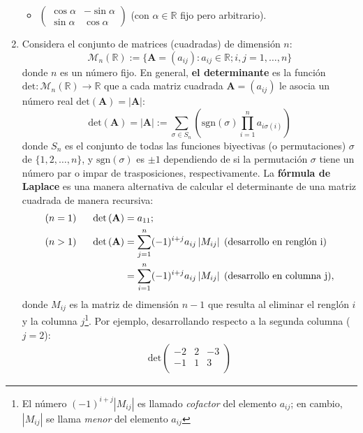 \documentclass[8pt,a4paper]{article}
\begin{document}
\begin{enumerate}
\begin{multicols}{3}
\begin{itemize}
			\item $\displaystyle \begin{pmatrix} \cos \alpha & -\sin \alpha \\ \sin \alpha & \cos \alpha \end{pmatrix}$ (con $\alpha\in\mathbb{R}$ fijo pero arbitrario).
		\end{itemize}
	\end{multicols}
		\item Considera el conjunto de matrices (cuadradas) de dimensión $n$:
%
			\[ \mathcal{M}_n(\mathbb{R}):=\{\mathbf{A}=(a_{ij}):a_{ij}\in\mathbb{R}; i,j=1,\dots,n\} \]
%
donde $n$ es un número fijo. En general, \textbf{el determinante} es la función $\mathrm{det}:\mathcal{M}_n(\mathbb{R})\longrightarrow\mathbb{R}$ que a cada matriz cuadrada $\mathbf{A}=(a_{ij})$ le asocia un número real $\mathrm{det}\left(\mathbf{A}\right)=\left|\mathbf{A}\right|$:
%
	\[
	\mathrm{det}\left(\mathbf{A}\right)=\left|\mathbf{A}\right|:=\sum_{\sigma\in S_n} 
		\left(\mathrm{sgn}(\sigma)\prod_{i=1}^n a_{i\sigma(i)}\right)
	\]
%
donde $S_n$ es el conjunto de todas las funciones biyectivas (o permutaciones) $\sigma$ de $\{1,2,\dots,n\}$, y $\mathrm{sgn}(\sigma)$ es $\pm 1$ dependiendo de si la permutación $\sigma$ tiene un número par o impar de trasposiciones, respectivamente. La \textbf{fórmula de Laplace} es una manera alternativa de calcular el determinante de una matriz cuadrada de manera recursiva:
%
\begin{align*}
(n=1) \hspace{6mm} \mathrm{det}\left(\mathbf{A}\right)&=a_{11}; \\
(n>1) \hspace{6mm} \mathrm{det}\left(\mathbf{A}\right)&=
		\sum_{j=1}^n (-1)^{i+j}a_{ij}\left|M_{ij}\right| \;(\text{desarrollo en renglón i})\\
		&=\sum_{i=1}^n (-1)^{i+j}a_{ij}\left|M_{ij}\right| \;\text{(desarrollo en columna j)},
\end{align*}
%
donde $M_{ij}$ es la matriz de dimensión $n-1$ que resulta al eliminar el renglón $i$ y la columna $j$\footnote{El número $(-1)^{i+j}\left|M_{ij}\right|$ es llamado \textit{cofactor} del elemento $a_{ij}$; en cambio, $\left|M_{ij}\right|$ se llama \textit{menor} del elemento $a_{ij}$}. Por ejemplo, desarrollando respecto a la segunda columna ($j=2$):
%
\begin{align*}
\mathrm{det}\begin{pmatrix}
				-2 & 2 & -3 \\
				-1 & 1 & 3 \\

\end{pmatrix}
\end{align*}
\end{enumerate}
\end{document}
